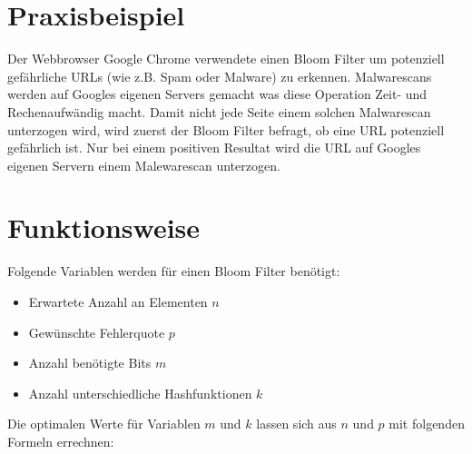 \documentclass{article}
\begin{document}
    \clearpage


    \section{Praxisbeispiel}
    Der Webbrowser Google Chrome verwendete einen Bloom Filter um potenziell gefährliche URLs (wie z.B. Spam oder Malware) zu erkennen. Malwarescans werden auf Googles eigenen Servers gemacht was diese Operation Zeit- und Rechenaufwändig macht. Damit nicht jede Seite einem solchen Malwarescan unterzogen wird, wird zuerst der Bloom Filter befragt, ob eine URL potenziell gefährlich ist. Nur bei einem positiven Resultat wird die URL auf Googles eigenen Servern einem Malewarescan unterzogen.


    \section{Funktionsweise}
    Folgende Variablen werden für einen Bloom Filter benötigt:

    \begin{itemize}
        \item Erwartete Anzahl an Elementen $n$
        \item Gewünschte Fehlerquote $p$
        \item Anzahl benötigte Bits $m$
        \item Anzahl unterschiedliche Hashfunktionen $k$
    \end{itemize}

    Die optimalen Werte für Variablen $m$ und $k$ lassen sich aus $n$ und $p$ mit folgenden Formeln errechnen:
\end{document}
